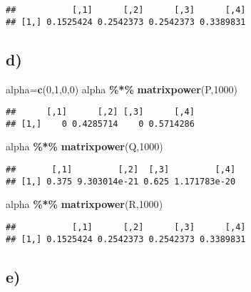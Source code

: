 \documentclass[
]{article}
\newenvironment{Shaded}{\begin{snugshade}}{\end{snugshade}}
\newcommand{\DecValTok}[1]{\textcolor[rgb]{0.00,0.00,0.81}{#1}}
\newcommand{\FunctionTok}[1]{\textcolor[rgb]{0.13,0.29,0.53}{\textbf{#1}}}
\newcommand{\NormalTok}[1]{#1}
\newcommand{\OtherTok}[1]{\textcolor[rgb]{0.56,0.35,0.01}{#1}}
\newcommand{\SpecialCharTok}[1]{\textcolor[rgb]{0.81,0.36,0.00}{\textbf{#1}}}
\begin{document}
\begin{verbatim}
##           [,1]      [,2]      [,3]      [,4]
## [1,] 0.1525424 0.2542373 0.2542373 0.3389831
\end{verbatim}

\hypertarget{d}{%
\subsection{d)}\label{d}}

\begin{Shaded}
\begin{Highlighting}[]
\NormalTok{alpha}\OtherTok{=}\FunctionTok{c}\NormalTok{(}\DecValTok{0}\NormalTok{,}\DecValTok{1}\NormalTok{,}\DecValTok{0}\NormalTok{,}\DecValTok{0}\NormalTok{)}
\NormalTok{alpha }\SpecialCharTok{\%*\%} \FunctionTok{matrixpower}\NormalTok{(P,}\DecValTok{1000}\NormalTok{)}
\end{Highlighting}
\end{Shaded}

\begin{verbatim}
##      [,1]      [,2] [,3]      [,4]
## [1,]    0 0.4285714    0 0.5714286
\end{verbatim}

\begin{Shaded}
\begin{Highlighting}[]
\NormalTok{alpha }\SpecialCharTok{\%*\%} \FunctionTok{matrixpower}\NormalTok{(Q,}\DecValTok{1000}\NormalTok{)}
\end{Highlighting}
\end{Shaded}

\begin{verbatim}
##       [,1]         [,2]  [,3]         [,4]
## [1,] 0.375 9.303014e-21 0.625 1.171783e-20
\end{verbatim}

\begin{Shaded}
\begin{Highlighting}[]
\NormalTok{alpha }\SpecialCharTok{\%*\%} \FunctionTok{matrixpower}\NormalTok{(R,}\DecValTok{1000}\NormalTok{)}
\end{Highlighting}
\end{Shaded}

\begin{verbatim}
##           [,1]      [,2]      [,3]      [,4]
## [1,] 0.1525424 0.2542373 0.2542373 0.3389831
\end{verbatim}

\hypertarget{e}{%
\subsection{e)}\label{e}}
\end{document}
